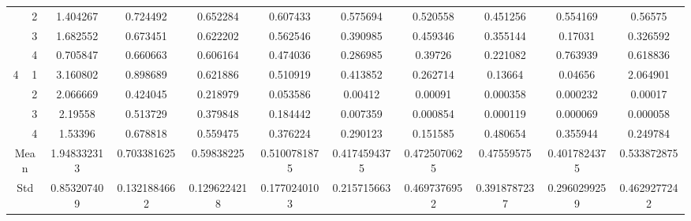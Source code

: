 \documentclass[draft,dvipsnames]{drexel-thesis}
\begin{document}
\begin{thesis}
\begin{table}[!t]
{\begin{tabular}{|c|c|c|c|c|c|c|c|c|c|c|}
                      & 2                   & 1.404267    & 0.724492     & 0.652284     & 0.607433     & 0.575694     & 0.520558     & 0.451256     & 0.554169     & 0.56575      \\ \cline{2-11} 
                      & 3                   & 1.682552    & 0.673451     & 0.622202     & 0.562546     & 0.390985     & 0.459346     & 0.355144     & 0.17031      & 0.326592     \\ \cline{2-11} 
                      & 4                   & 0.705847    & 0.660663     & 0.606164     & 0.474036     & 0.286985     & 0.39726      & 0.221082     & 0.763939     & 0.618836     \\ \hline
\multirow{4}{*}{4}    & 1                   & 3.160802    & 0.898689     & 0.621886     & 0.510919     & 0.413852     & 0.262714     & 0.13664      & 0.04656      & 2.064901     \\ \cline{2-11} 
                      & 2                   & 2.066669    & 0.424045     & 0.218979     & 0.053586     & 0.00412      & 0.00091      & 0.000358     & 0.000232     & 0.00017      \\ \cline{2-11} 
                      & 3                   & 2.19558     & 0.513729     & 0.379848     & 0.184442     & 0.007359     & 0.000854     & 0.000119     & 0.000069     & 0.000058     \\ \cline{2-11} 
                      & 4                   & 1.53396     & 0.678818     & 0.559475     & 0.376224     & 0.290123     & 0.151585     & 0.480654     & 0.355944     & 0.249784     \\ \hline
\multicolumn{2}{|c|}{Mean}                  & 1.948332313 & 0.703381625  & 0.59838225   & 0.5100781875 & 0.4174594375 & 0.4725070625 & 0.47559575   & 0.4017824375 & 0.533872875  \\ \hline
\multicolumn{2}{|c|}{Std}                   & 0.853207409 & 0.1321884662 & 0.1296224218 & 0.1770240103 & 0.215715663  & 0.4697376952 & 0.3918787237 & 0.2960299259 & 0.4629277242 \\ \hline
\end{tabular}}
\end{table}


\end{thesis}
\end{document}
